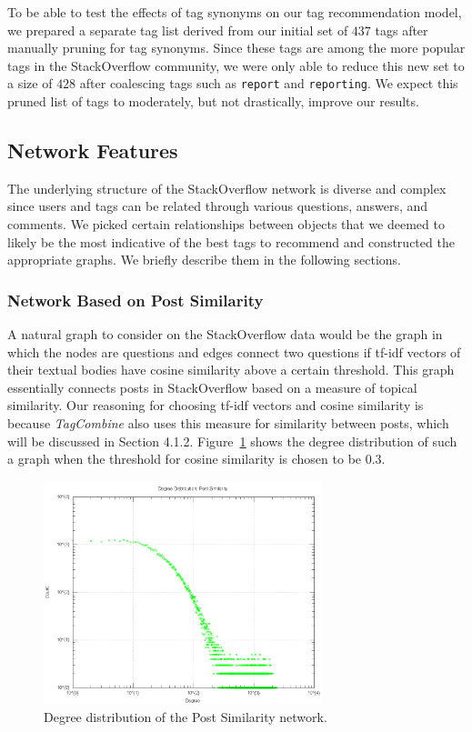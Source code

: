 \documentclass[10pt]{IEEEtran}
\begin{document}
To be able to test the effects of tag synonyms on our tag recommendation model, we prepared a separate tag list derived from our initial set of $437$ tags after manually pruning for tag synonyms. Since these tags are among the more popular tags in the StackOverflow community, we were only able to reduce this new set to a size of $428$ after coalescing tags such as \texttt{report} and \texttt{reporting}. We expect this pruned list of tags to moderately, but not drastically, improve our results.

\subsection{Network Features}

The underlying structure of the StackOverflow network is diverse and complex since users and tags can be related through various questions, answers, and comments. We picked certain relationships between objects that we deemed to likely be the most indicative of the best tags to recommend and constructed the appropriate graphs. We briefly describe them in the following sections.

\subsubsection{Network Based on Post Similarity}

A natural graph to consider on the StackOverflow data would be the graph in which the nodes are questions and edges connect two questions if tf-idf vectors of their textual bodies have cosine similarity above a certain threshold. This graph essentially connects posts in StackOverflow based on a measure of topical similarity. Our reasoning for choosing tf-idf vectors and cosine similarity is because \textit{TagCombine} also uses this measure for similarity between posts, which will be discussed in Section 4.1.2. Figure~\ref{fig:post_dd} shows the degree distribution of such a graph when the threshold for cosine similarity is chosen to be $0.3$.

\begin{figure}[h]
  \centering
    \includegraphics[width=3.2in]{similarity_degdistr.png}
  \caption{Degree distribution of the Post Similarity network.}
  \label{fig:post_dd}
\end{figure}
\end{document}
